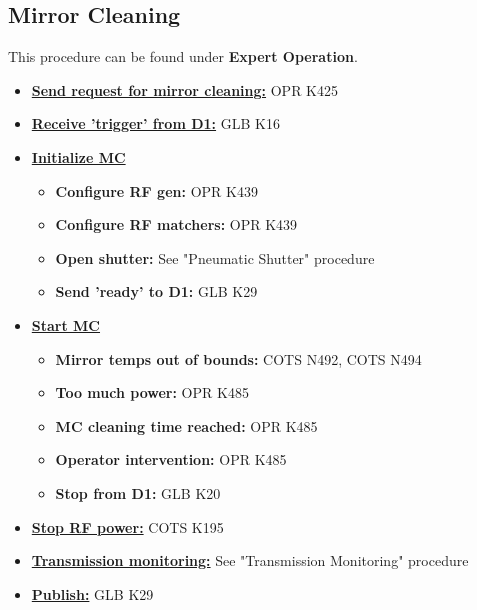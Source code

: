 \subsection{Mirror Cleaning}
\label{subsubsec:mc}
This procedure can be found under \textbf{Expert Operation}.
\begin{itemize}
	\item \underline{\textbf{Send request for mirror cleaning:}} OPR K425
	\item \underline{\textbf{Receive 'trigger' from D1:}} GLB K16
	\item \underline{\textbf{Initialize MC}} 
		\begin{itemize}
			\item \textbf{Configure RF gen:} OPR K439
			\item \textbf{Configure RF matchers:} OPR K439
			\item \textbf{Open shutter:} See "Pneumatic Shutter" procedure
			\item \textbf{Send 'ready' to D1:} GLB K29 
		\end{itemize}
	\item \underline{\textbf{Start MC}}
		\begin{itemize}
			\item \textbf{Mirror temps out of bounds:} COTS N492, COTS N494
			\item \textbf{Too much power:} OPR K485
			\item \textbf{MC cleaning time reached:} OPR K485
			\item \textbf{Operator intervention:} OPR K485
			\item \textbf{Stop from D1:} GLB K20
		\end{itemize}
	\item \underline{\textbf{Stop RF power:}} COTS K195
	\item \underline{\textbf{Transmission monitoring:}} See "Transmission Monitoring" procedure
	\item \underline{\textbf{Publish:}} GLB K29
\end{itemize}


































